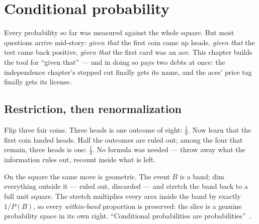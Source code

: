 \chapter{Conditional probability}

\begin{narrative}
Every probability so far was measured against the whole square. But most
questions arrive mid-story: \emph{given that} the first coin came up
heads, \emph{given that} the test came back positive, \emph{given that}
the first card was an ace. This chapter builds the tool for
``given that'' — and in doing so pays two debts at once: the
independence chapter's stepped cut finally gets its name, and the aces'
price tag finally gets its license.

\section{Restriction, then renormalization}

Flip three fair coins. Three heads is one outcome of eight:
$\tfrac18$. Now learn that the first coin landed heads. Half the
outcomes are ruled out; among the four that remain, three heads is one:
$\tfrac14$. No formula was needed — throw away what the information
rules out, recount inside what is left.

On the square the same move is geometric. The event $B$ is a band; dim
everything outside it — ruled out, discarded — and stretch the band
back to a full unit square. The stretch multiplies every area inside
the band by exactly $1/P(B)$, so every \emph{within-band} proportion is
preserved: the slice is a genuine probability space in its own right.
``Conditional probabilities are
probabilities''~\cite{probability-blitzstein-hwang-introduction-to-probability-chs-1-2-excerpt}.


\end{narrative}
